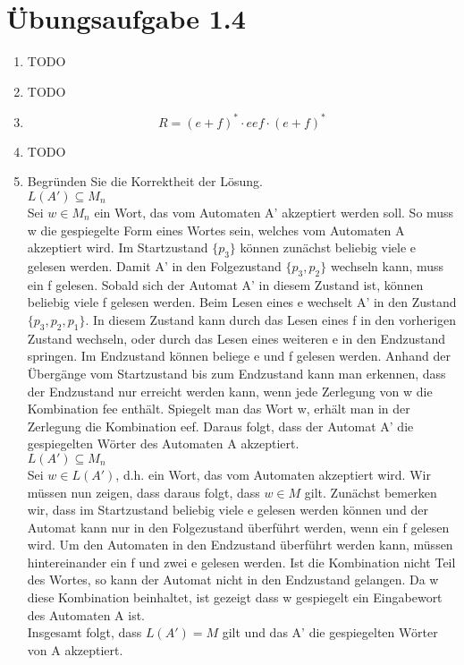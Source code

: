 \documentclass[a4paper]{scrartcl}
\begin{document}
\section*{Übungsaufgabe 1.4}
\begin{enumerate}
    \item TODO
    \item TODO
    \item
        \begin{equation}
            R = (e + f)^* \cdot eef \cdot (e + f)^*
        \end{equation}
        
    \item TODO
    \item Begründen Sie die Korrektheit der Lösung. \\
    	$L(A') \subseteq M_n$ \\
    	Sei $w \in M_n$ ein Wort, das vom Automaten A' akzeptiert werden soll. So muss w die gespiegelte Form eines Wortes sein, welches vom Automaten A akzeptiert wird. Im Startzustand $\{p_3\}$ können zunächst beliebig viele e gelesen werden. Damit A' in den Folgezustand $\{p_3,p_2\}$ wechseln kann, muss ein f gelesen. Sobald sich der Automat A' in diesem Zustand ist, können beliebig viele f gelesen werden. Beim Lesen eines e wechselt A' in den Zustand $\{p_3,p_2,p_1\}$. In diesem Zustand kann durch das Lesen eines f in den vorherigen Zustand wechseln, oder durch das Lesen eines weiteren e in den Endzustand springen. Im Endzustand können beliege e und f gelesen werden. Anhand der Übergänge vom Startzustand bis zum Endzustand kann man erkennen, dass der Endzustand nur erreicht werden kann, wenn jede Zerlegung von w die Kombination fee enthält. Spiegelt man das Wort w, erhält man in der Zerlegung die Kombination eef. Daraus folgt, dass der Automat A' die gespiegelten Wörter des Automaten A akzeptiert. \\
    	
    	$L(A') \subseteq M_n$ \\
   		Sei $w \in L(A')$, d.h. ein Wort, das vom Automaten akzeptiert wird. Wir müssen nun zeigen, dass daraus folgt, dass $w \in M$ gilt. Zunächst bemerken wir, dass im Startzustand beliebig viele e gelesen werden können und der Automat kann nur in den Folgezustand überführt werden, wenn ein f gelesen wird. Um den Automaten in den Endzustand überführt werden kann, müssen hintereinander ein f und zwei e gelesen werden. Ist die Kombination nicht Teil des Wortes, so kann der Automat nicht in den Endzustand gelangen. Da w diese Kombination beinhaltet, ist gezeigt dass w gespiegelt ein Eingabewort des Automaten A ist. \\
   		Insgesamt folgt, dass $L(A') = M$ gilt und das A' die gespiegelten Wörter von A akzeptiert.  
    	
    	  

    	
\end{enumerate}
\end{document}
